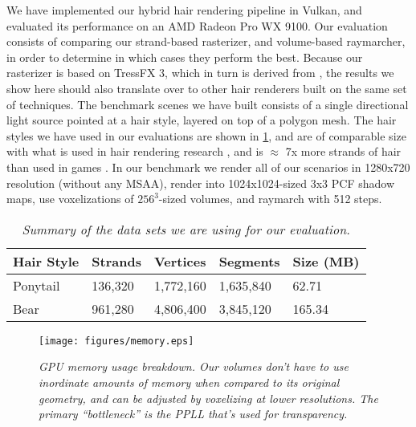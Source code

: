 \documentclass{egpubl}
\begin{document}

We have implemented our hybrid hair rendering pipeline in Vulkan, and evaluated its performance on an AMD Radeon Pro WX 9100. Our evaluation consists of comparing our strand-based rasterizer, and volume-based raymarcher, in order to determine in which cases they perform the best. Because our rasterizer is based on TressFX 3, which in turn is derived from \cite{yu2012framework}, the results we show here should also translate over to other hair renderers built on the same set of techniques. The benchmark scenes we have built consists of a single directional light source pointed at a hair style, layered on top of a polygon mesh. The hair styles we have used in our evaluations are shown in \cref{tab:dataset}, and are of comparable size with what is used in hair rendering research \cite{yuksel2008deep, ren2010interactive, andersen2016hybrid}, and is $\approx$ 7x more strands of hair than used in games \cite{lacroix2013tressfx}. In our benchmark we render all of our scenarios in 1280x720 resolution (without any MSAA), render into 1024x1024-sized 3x3 PCF shadow maps, use voxelizations of $256^3$-sized volumes, and raymarch with 512 steps.

\begin{table}[htb]
    \centering
    \begin{tabular}{lllll}
        \toprule
        \textbf{Hair Style} & \textbf{Strands} & \textbf{Vertices} & \textbf{Segments} & \textbf{Size (MB)}\\
        \midrule
        Ponytail & 136,320 & 1,772,160 & 1,635,840 & 62.71 \\
        Bear     & 961,280 & 4,806,400 & 3,845,120 & 165.34 \\
        \bottomrule
    \end{tabular}
    \caption{\emph{Summary of the data sets we are using for our evaluation.}}
    \label{tab:dataset}
    \vspace{-2mm}
\end{table}

\begin{figure}[htb]
    \centering
    \texttt{[image: figures/memory.eps]}
    \caption{\emph{GPU memory usage breakdown. Our volumes don't have to use inordinate amounts of memory when compared to its original geometry, and can be adjusted by voxelizing at lower resolutions. The primary ``bottleneck'' is the PPLL that's used for transparency.}}
    \label{fig:memory}
    \vspace{-2mm}
\end{figure}
\end{document}
